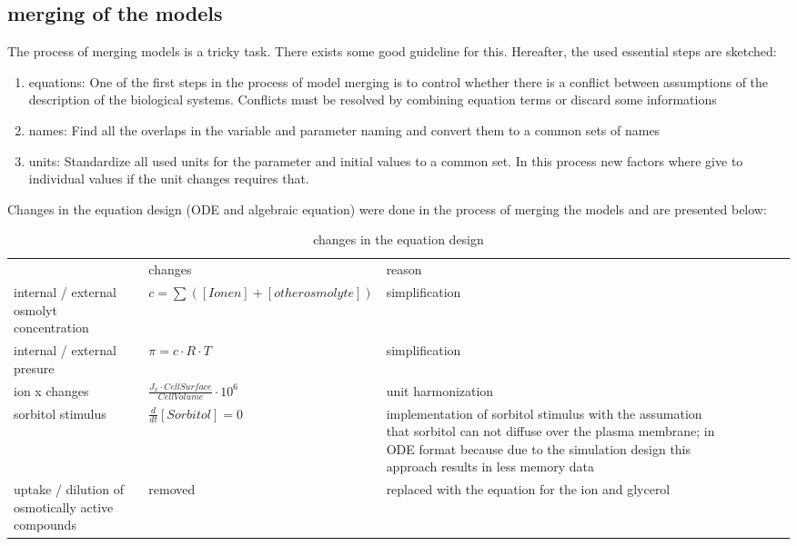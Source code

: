 \subsection{merging of the models}
The process of merging models is a tricky task. There exists some good guideline \cite{Liebermeister2008ValidityAC} for this.
Hereafter, the used essential steps are sketched:
\begin{enumerate}
	\item equations: One of the first steps in the process of model merging is to control whether there is a conflict between assumptions of the description of the biological systems. Conflicts must be resolved by combining equation terms or discard some informations
	\item names: Find all the overlaps in the variable and parameter naming and convert them to a common sets of names
	\item units: Standardize all used units for the parameter and initial values to a common set. In this process new factors where give to individual values if the unit changes requires that.
\end{enumerate}
Changes in the equation design (ODE and algebraic equation) were done in the process of merging the models and are presented below:
\begin{table} [h]
	\footnotesize
\begin{center} 
	\caption{changes in the equation design}
\begin{tabular} {l l l l l l l l}
& changes & reason\\
internal / external osmolyt concentration & $c = \sum ([Ionen]+[other osmolyte])$ & simplification\\ 
internal / external presure & $\pi = c \cdot R \cdot T	$ & simplification\\
ion x changes & $\frac{J_x \cdot CellSurface}{CellVolume} \cdot 10^{6}$ & unit harmonization\\
sorbitol stimulus & $\frac{d}{dt}[Sorbitol]=0$ & implementation of sorbitol stimulus with the assumation that sorbitol can not diffuse over the plasma membrane; in ODE format because due to the simulation design this approach results in less memory data\\
uptake / dilution of osmotically active compounds & removed & replaced with the equation for the ion and glycerol
\end{tabular}
\label{changesOnTheModels}
\end{center}
\end{table}


